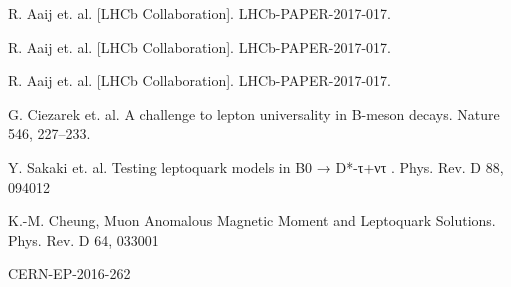 \documentclass[
aps,
prl,
reprint,
showpacs,
]{revtex4-1}
\begin{document}
\begin{thebibliography}{9}

R. Aaij et. al. [LHCb Collaboration]. LHCb-PAPER-2017-017.

R. Aaij et. al. [LHCb Collaboration]. LHCb-PAPER-2017-017.

R. Aaij et. al. [LHCb Collaboration]. LHCb-PAPER-2017-017.

G. Ciezarek et. al. A challenge to lepton universality in B-meson decays. Nature 546, 227–233.

Y. Sakaki et. al. Testing leptoquark models in B0 → D*-τ+ντ . Phys. Rev. D 88, 094012

K.-M. Cheung, Muon Anomalous Magnetic Moment and Leptoquark Solutions. Phys. Rev. D 64, 033001

CERN-EP-2016-262















\end{thebibliography}
\end{document}
